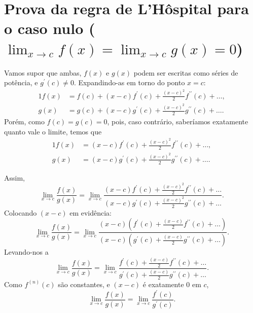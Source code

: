 \documentclass{article}
\begin{document}
\section{Prova da regra de L'Hôspital para o caso nulo \newline($\lim_{x \to c} f(x) = \lim_{x \to c} g(x) = 0$)}
Vamos supor que ambas, $f(x)$ e $g(x)$ podem ser escritas como séries de potência, e $g^{\prime}(c) \neq 0$. Expandindo-as em torno do ponto $x=c$:
\begin{alignat}{1}
 f(x) &= f(c) + (x-c)f^{\prime}(c) + \frac{(x-c)^2}{2}f^{\prime\prime}(c) + \ldots, \\
 g(x) &= g(c) + (x-c)g^{\prime}(c) + \frac{(x-c)^2}{2}g^{\prime\prime}(c) + \ldots.
\end{alignat}
Porém, como $f(c) = g(c) = 0$, pois, caso contrário, saberíamos exatamente quanto vale o limite, temos que
\begin{alignat}{1}
 f(x) &= (x-c)f^{\prime}(c) + \frac{(x-c)^2}{2}f^{\prime\prime}(c) + \ldots, \\
 g(x) &= (x-c)g^{\prime}(c) + \frac{(x-c)^2}{2}g^{\prime\prime}(c) + \ldots.
\end{alignat}

Assim,
\begin{equation}
 \lim_{x \to c} \frac{f(x)}{g(x)} = \lim_{x \to c} \frac{(x-c)f^{\prime}(c) + \frac{(x-c)^2}{2}f^{\prime\prime}(c) + \ldots}
 {(x-c)g^{\prime}(c) + \frac{(x-c)^2}{2}g^{\prime\prime}(c) + \ldots}.
\end{equation}
Colocando $(x-c)$ em evidência:
\begin{equation}
 \lim_{x \to c} \frac{f(x)}{g(x)} = \lim_{x \to c} \frac{(x-c)(f^{\prime}(c) + \frac{(x-c)}{2}f^{\prime\prime}(c) + \ldots)}
 {(x-c)(g^{\prime}(c) + \frac{(x-c)}{2}g^{\prime\prime}(c) + \ldots)}.
\end{equation}
Levando-nos a
\begin{equation}
 \lim_{x \to c} \frac{f(x)}{g(x)} = \lim_{x \to c} \frac{f^{\prime}(c) + \frac{(x-c)}{2}f^{\prime\prime}(c) + \ldots}
 {g^{\prime}(c) + \frac{(x-c)}{2}g^{\prime\prime}(c) + \ldots}.
\end{equation}
Como $f^{(n)}(c)$ são constantes, e $(x-c)$ é exatamente 0 em $c$,
\begin{equation}
 \lim_{x \to c} \frac{f(x)}{g(x)} = \lim_{x \to c} \frac{f^{\prime}(c)}
 {g^{\prime}(c)}.
\end{equation}
\end{document}
